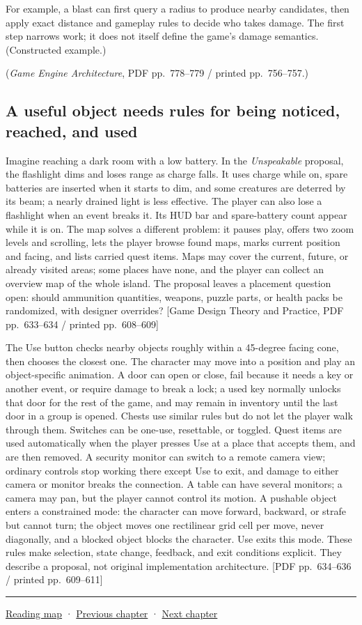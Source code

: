 For example, a blast can first query a radius to produce nearby candidates, then apply exact distance and gameplay rules to decide who takes damage. The first step narrows work; it does not itself define the game's damage semantics. (Constructed example.)

(\emph{Game Engine Architecture}, PDF pp.~778--779 / printed pp.~756--757.)

\subsection{A useful object needs rules for being noticed, reached, and used}\label{06-engine-ii-ch031-a-useful-object-needs-rules-for-being-noticed-reached-and-used}

Imagine reaching a dark room with a low battery. In the \emph{Unspeakable} proposal, the flashlight dims and loses range as charge falls. It uses charge while on, spare batteries are inserted when it starts to dim, and some creatures are deterred by its beam; a nearly drained light is less effective. The player can also lose a flashlight when an event breaks it. Its HUD bar and spare-battery count appear while it is on. The map solves a different problem: it pauses play, offers two zoom levels and scrolling, lets the player browse found maps, marks current position and facing, and lists carried quest items. Maps may cover the current, future, or already visited areas; some places have none, and the player can collect an overview map of the whole island. The proposal leaves a placement question open: should ammunition quantities, weapons, puzzle parts, or health packs be randomized, with designer overrides? {[}Game Design Theory and Practice, PDF pp.~633--634 / printed pp.~608--609{]}

The Use button checks nearby objects roughly within a 45-degree facing cone, then chooses the closest one. The character may move into a position and play an object-specific animation. A door can open or close, fail because it needs a key or another event, or require damage to break a lock; a used key normally unlocks that door for the rest of the game, and may remain in inventory until the last door in a group is opened. Chests use similar rules but do not let the player walk through them. Switches can be one-use, resettable, or toggled. Quest items are used automatically when the player presses Use at a place that accepts them, and are then removed. A security monitor can switch to a remote camera view; ordinary controls stop working there except Use to exit, and damage to either camera or monitor breaks the connection. A table can have several monitors; a camera may pan, but the player cannot control its motion. A pushable object enters a constrained mode: the character can move forward, backward, or strafe but cannot turn; the object moves one rectilinear grid cell per move, never diagonally, and a blocked object blocks the character. Use exits this mode. These rules make selection, state change, feedback, and exit conditions explicit. They describe a proposal, not original implementation architecture. {[}PDF pp.~634--636 / printed pp.~609--611{]}

\begin{center}\rule{0.5\linewidth}{0.5pt}\end{center}

\hyperref[volume-reading-map]{Reading map} · \hyperref[06-engine-ii-ch030]{Previous chapter} · \hyperref[06-engine-ii-ch032]{Next chapter}
